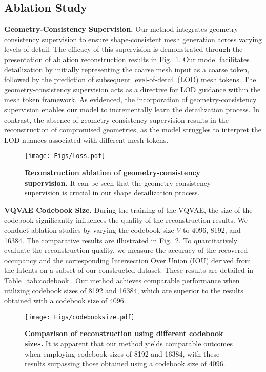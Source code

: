 \subsection{Ablation Study}
\noindent\textbf{Geometry-Consistency Supervision.}
Our method integrates geometry-consistency supervision to ensure shape-consistent mesh generation across varying levels of detail. The efficacy of this supervision is demonstrated through the presentation of ablation reconstruction results in Fig.~\ref{fig:ms_sup}. Our model facilitates detailization by initially representing the coarse mesh input as a coarse token, followed by the prediction of subsequent level-of-detail (LOD) mesh tokens. The geometry-consistency supervision acts as a directive for LOD guidance within the mesh token framework. As evidenced, the incorporation of geometry-consistency supervision enables our model to incrementally learn the detailization process. In contrast, the absence of geometry-consistency supervision results in the reconstruction of compromised geometries, as the model struggles to interpret the LOD nuances associated with different mesh tokens.
\begin{figure}
    \centering
    \texttt{[image: Figs/loss.pdf]}
    \caption{\textbf{Reconstruction ablation of geometry-consistency supervision.} It can be seen that the geometry-consistency supervision is crucial in our shape detailization process.}
    \label{fig:ms_sup}
\end{figure}

\noindent\textbf{VQVAE Codebook Size.}
During the training of the VQVAE, the size of the codebook significantly influences the quality of the reconstruction results. We conduct ablation studies by varying the codebook size $V$ to 4096, 8192, and 16384. The comparative results are illustrated in Fig.~\ref{fig:cb}. To quantitatively evaluate the reconstruction quality, we measure the accuracy of the recovered occupancy and the corresponding Intersection Over Union (IOU) derived from the latents on a subset of our constructed dataset. These results are detailed in Table~\ref{tab:codebook}. Our method achieves comparable performance when utilizing codebook sizes of 8192 and 16384, which are superior to the results obtained with a codebook size of 4096.

\begin{figure}
    \centering
    \texttt{[image: Figs/codebooksize.pdf]}
    \caption{\textbf{Comparison of reconstruction using different codebook sizes.} It is apparent that our method yields comparable outcomes when employing codebook sizes of 8192 and 16384, with these results surpassing those obtained using a codebook size of 4096.}
    \label{fig:cb}
\end{figure}


